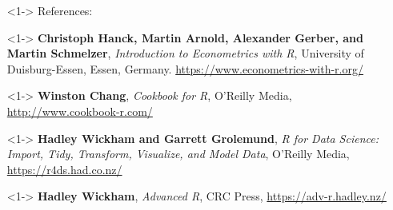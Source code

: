 

\begin{frame}
\titlepage \vspace{-30pt}
\begin{footnotesize}
\begin{itemize}
\item[]<1-> References: \medskip
\item[]<1-> 
\textbf{Christoph Hanck, Martin Arnold, Alexander Gerber, and Martin Schmelzer}, \textit{Introduction to Econometrics with R}, University of Duisburg-Essen, Essen, Germany.%
\newline \url{https://www.econometrics-with-r.org/}
\bigskip
\item[]<1->
\textbf{Winston Chang}, \textit{Cookbook for R}, O'Reilly Media,%
\newline\url{http://www.cookbook-r.com/}
\bigskip
\item[]<1->
\textbf{Hadley Wickham and Garrett Grolemund}, \textit{R for Data Science: Import, Tidy, Transform, Visualize, and Model Data}, O'Reilly Media,%
\newline \url{https://r4ds.had.co.nz/}
\bigskip
\item[]<1->
\textbf{Hadley Wickham}, \textit{Advanced R}, CRC Press,%
\newline \url{https://adv-r.hadley.nz/}
\end{itemize}
\end{footnotesize}
\end{frame}

